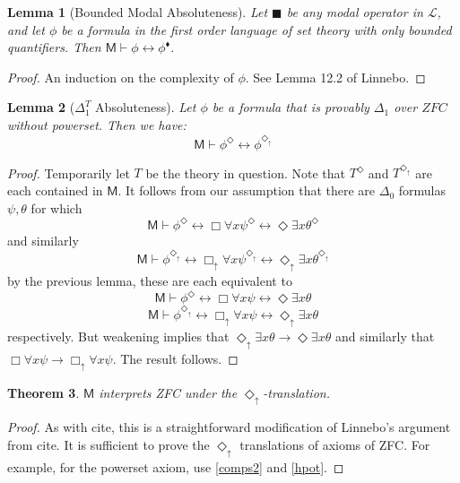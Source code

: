 \documentclass{article}
\newtheorem{Theorem}{Theorem}[section]
\newtheorem{Lemma}[Theorem]{Lemma}
\theoremstyle{definition}
\newcommand{\du}{\Diamond_\uparrow}
\newcommand{\bu}{\Box_\uparrow}
\begin{document}
\begin{Lemma}[Bounded Modal Absoluteness]\label{BMA}
    Let $\blacksquare$ be any modal operator in $\mathcal{L}$, and let $\phi$ be 
    a formula in the first order language of set theory
    with only bounded quantifiers. Then
    $\mathsf{M} \vdash \phi \leftrightarrow \phi^\blacklozenge$.
\end{Lemma}
\begin{proof}
    An induction on the complexity of $\phi$. See Lemma 12.2 of Linnebo.
\end{proof}
\begin{Lemma}[$\Delta_1^T$ Absoluteness]\label{DA}
    Let $\phi$ be a formula that is provably $\Delta_1$ over $ZFC$ without 
    powerset. Then we have: 
    \[\mathsf{M} \vdash \phi^{\Diamond} \leftrightarrow \phi^{\du}\]
\end{Lemma}
\begin{proof}
    Temporarily let $T$ be the theory in question.
    Note that $T^\Diamond$ and $T^{\du}$ are each contained in $\mathsf{M}$.
    It follows from our assumption that there are $\Delta_0$ formulas $\psi, \theta$
    for which
    \[\mathsf{M} \vdash \phi^\Diamond \leftrightarrow 
    \Box \forall x \psi^\Diamond \leftrightarrow 
    \Diamond \exists x \theta^\Diamond \] 
    and similarly
    \[\mathsf{M} \vdash \phi^{\du} \leftrightarrow 
    \bu \forall x \psi^{\du} \leftrightarrow 
    \du \exists x \theta^{\du} \] 
    by the previous lemma, these are each equivalent to 
    \[\mathsf{M} \vdash \phi^\Diamond \leftrightarrow 
    \Box \forall x \psi \leftrightarrow 
    \Diamond \exists x \theta \] 
    \[\mathsf{M} \vdash \phi^{\du} \leftrightarrow 
    \bu \forall x \psi \leftrightarrow 
    \du \exists x \theta \] 
    respectively. But weakening implies that 
    $\du \exists x \theta \rightarrow \Diamond \exists x \theta$
    and similarly that $\Box \forall x \psi \rightarrow \bu \forall x \psi$.
    The result follows.
\end{proof}

\begin{Theorem}
    $\mathsf{M}$ interprets ZFC under the $\du$-translation.
\end{Theorem}
\begin{proof}
    As with cite, this is a straightforward modification of 
    Linnebo's argument from cite. It is sufficient to prove the $\du$ 
    translations of axioms of ZFC. For example, for the powerset 
    axiom, use \eqref{comps2} and \eqref{hpot}.
\end{proof}
\end{document}

